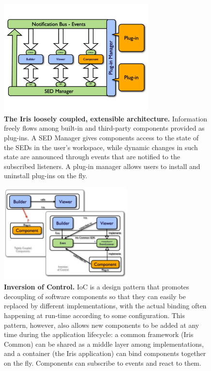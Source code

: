\documentclass[preprint,authoryear,5p]{elsarticle}
\begin{document}
\begin{figure} \begin{center}
\includegraphics[width=0.7\textwidth]{IrisDiagrams.001.pdf}
\caption{\textbf{The Iris loosely coupled, extensible architecture.}  Information
freely flows among built-in and third-party components provided as plug-ins. A
SED Manager gives components access to the state of the SEDs in the user's
workspace, while dynamic changes in such state are announced through events that
are notified to the subscribed listeners. A plug-in manager allows users to
install and uninstall plug-ins on the fly.} \label{fig:architecture}
\end{center} \end{figure}

\begin{figure} \begin{center}
\includegraphics[width=0.6\textwidth]{IrisDiagrams.003.pdf}
\caption{\textbf{Inversion of Control.}  IoC is a design pattern that promotes
decoupling of software components so that they can easily be replaced by
different implementations, with the actual binding often happening at run-time
according to some configuration. This pattern, however, also allows new
components to be added at any time during the application lifecycle: a common
framework (Iris Common) can be shared as a middle layer among implementations,
and a container (the Iris application) can bind components together on the fly.
Components can subscribe to events and react to them.} \label{fig:ioc}
\end{center} \end{figure}
\end{document}
